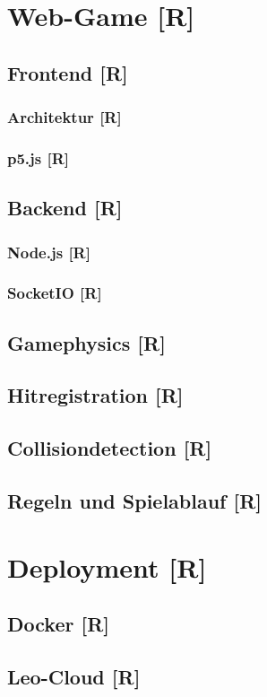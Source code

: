 \section{Web-Game [R]}
\subsection{Frontend [R]}
\subsubsection{Architektur [R]}
\subsubsection{p5.js [R]}
\subsection{Backend [R]}
\subsubsection{Node.js [R]}
\subsubsection{SocketIO [R]}
\subsection{Gamephysics [R]}
\subsection{Hitregistration [R]}
\subsection{Collisiondetection [R]}
\subsection{Regeln und Spielablauf [R]}
\section{Deployment [R]}
\subsection{Docker [R]}
\subsection{Leo-Cloud [R]}

